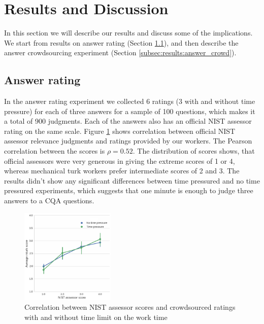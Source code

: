 \documentclass[11pt,letterpaper]{article}
\begin{document}
\section{Results and Discussion}
\label{sec:results}

In this section we will describe our results and discuss some of the implications.
We start from results on answer rating (Section \ref{subsec:results:answer_rating}), and then describe the answer crowdsourcing experiment (Section \ref{subsec:results:answer_crowd}).

\subsection{Answer rating}
\label{subsec:results:answer_rating}

In the answer rating experiment we collected 6 ratings (3 with and without time pressure) for each of three answers for a sample of 100 questions, which makes it a total of 900 judgments.
Each of the answers also has an official NIST assessor rating on the same scale.
Figure \ref{figure:score_correlation} shows correlation between official NIST assessor relevance judgments and ratings provided by our workers.
The Pearson correlation between the scores is $\rho=0.52$.
The distribution of scores shows, that official assessors were very generous in giving the extreme scores of 1 or 4, whereas mechanical turk workers prefer intermediate scores of 2 and 3.
The results didn't show any significant differences between time pressured and no time pressured experiments, which suggests that one minute is enough to judge three answers to a CQA questions.

\begin{figure}[t!]
	\centering
	\includegraphics[width=0.4\textwidth]{img/score_correlation}
	\caption{Correlation between NIST assessor scores and crowdsourced ratings with and without time limit on the work time}
	\label{figure:score_correlation}
\end{figure}
	
\end{document}
